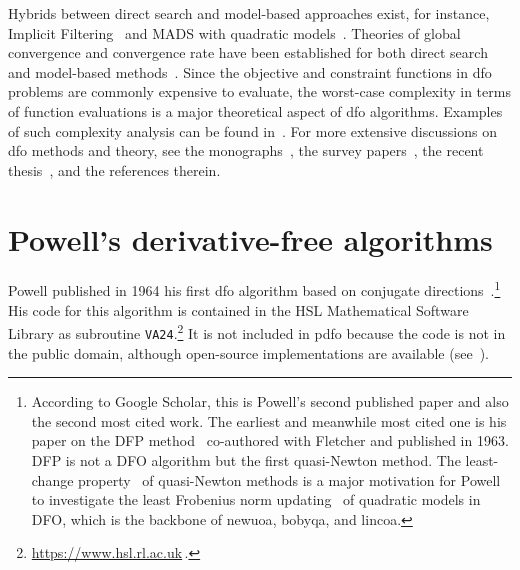 \documentclass[manuscript,screen,review]{acmart}
\numberwithin{equation}{section}
\begin{document}
Hybrids between direct search and model-based approaches exist, for instance, Implicit Filtering~\cite[Algorithm~4.7]{Kelley_2011} and MADS with quadratic models~\cite{Conn_Digabel_2013}.
Theories of global convergence and convergence rate have been established for both direct search~\cite{Torczon_1997,Kolda_Lewis_Torczon_2003,Vicente_2013,Gratton_Etal_2015,Dodangeh_Vicente_2016} and model-based methods~\cite{Conn_Scheinberg_Toint_1997a,Conn_Scheinberg_Vicente_2009a,Powell_2012,Garmanjani_Judice_Vicente_2016}.
Since the objective and constraint functions in \gls{dfo} problems are commonly expensive to evaluate, the worst-case complexity in terms of function evaluations is a major theoretical aspect of \gls{dfo} algorithms.
Examples of such complexity analysis can be found in~\cite{Vicente_2013,Gratton_Etal_2015,Dodangeh_Vicente_2016,Garmanjani_Judice_Vicente_2016}.
For more extensive discussions on \gls{dfo} methods and theory, see the monographs~\cite{Conn_Scheinberg_Vicente_2009b,Audet_Hare_2017}, the survey papers~\cite{Rios_Sahinidis_2013,Custodio_Scheinberg_Vicente_2017,Larson_Menickelly_Wild_2019}, the recent thesis~\cite{Ragonneau_2022}, and the references therein.

\section{Powell's derivative-free algorithms}
\label{sec:powell}

Powell published in 1964 his first \gls{dfo} algorithm based on conjugate directions~\cite{Powell_1964}.\footnote{
    According to Google Scholar, this is Powell's second published paper and also the second most cited work.
    The earliest and meanwhile most cited one is his paper on the DFP method~\cite{Fletcher_Powell_1963} co-authored with Fletcher and published in 1963.
    DFP is not a DFO algorithm but the first quasi-Newton method.
    The least-change property~\cite{Dennis_Schnabel_1979} of quasi-Newton methods is a major motivation for Powell to investigate the least Frobenius norm updating~\cite{Powell_2004b} of quadratic models in DFO, which is the backbone of \gls{newuoa}, \gls{bobyqa}, and \gls{lincoa}.
}
His code for this algorithm is contained in the
HSL Mathematical Software Library as subroutine \texttt{VA24}.\footnote{\url{https://www.hsl.rl.ac.uk}\,.}
It is not included in \gls{pdfo} because the code is not in the public domain, although open-source implementations are available (see~\cite[footnote~4]{Conn_Scheinberg_Toint_1997b}).
\end{document}
